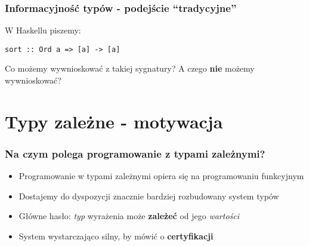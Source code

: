 \documentclass{beamer}
\begin{document}





\begin{frame}[fragile]
\frametitle{Informacyjność typów - podejście ``tradycyjne''}

W Haskellu piszemy:

\begin{lstlisting}
sort :: Ord a => [a] -> [a]
\end{lstlisting}

Co możemy wywnioskować z takiej sygnatury? A czego {\bf nie} możemy wywnioskować?


\end{frame}


\section{Typy zależne - motywacja}

\begin{frame}
\frametitle{Na czym polega programowanie z typami zależnymi?}

\begin{itemize}

\item Programowanie w typami zależnymi opiera się na programowaniu funkcyjnym
\item Dostajemy do dyspozycji znacznie bardziej rozbudowany system typów
\item Główne hasło: \emph{typ} wyrażenia może {\bf zależeć} od jego \emph{wartości}
\item System wystarczająco silny, by mówić o {\bf certyfikacji}

\end{itemize}

\end{frame}
\end{document}
